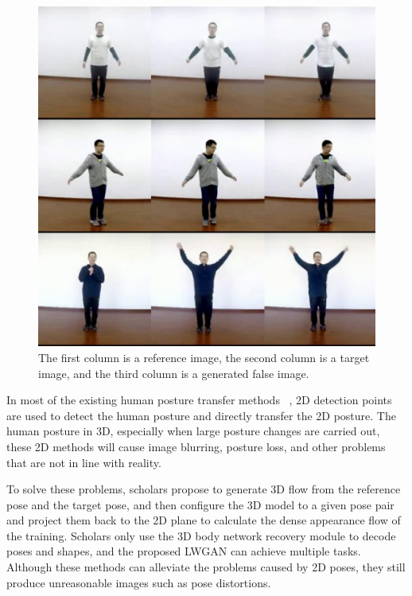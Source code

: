 \begin{figure}
	\centering
	\includegraphics[scale=1]{image01.png}
	\caption{ The first column is a reference image, the second column is a target image, and the third column is a generated false image.}
	\label{image01}
\end{figure}	

In most of the existing human posture transfer methods ~\cite{chan2019everybody,zhu2019progressive,ma2017pose,ge2018fd}, 2D detection points are used to detect the human posture and directly transfer the 2D posture. The human posture in 3D, especially when large posture changes are carried out, these 2D methods will cause image blurring, posture loss, and other problems that are not in line with reality.
	
To solve these problems, scholars \cite{li2019dense} propose to generate 3D flow from the reference pose and the target pose, and then configure the 3D model to a given pose pair and project them back to the 2D plane to calculate the dense appearance flow of the training. Scholars \cite{liu2019liquid} only use the 3D body network recovery module to decode poses and shapes, and the proposed LWGAN can achieve multiple tasks. Although these methods can alleviate the problems caused by 2D poses, they still produce unreasonable images such as pose distortions.
	 
